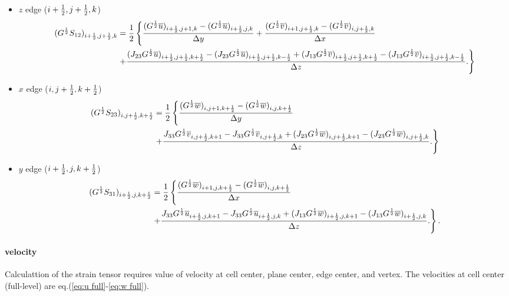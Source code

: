 \begin{itemize}
  \item $z$ edge ($i+\frac{1}{2},j+\frac{1}{2},k$)
    \begin{align}
      (G^{\frac{1}{2}}S_{12})_{i+\frac{1}{2},j+\frac{1}{2},k} &= \frac{1}{2}\left\{
      \frac{(G^{\frac{1}{2}}\overline{u})_{i+\frac{1}{2},j+1,k}-(G^{\frac{1}{2}}\overline{u})_{i+\frac{1}{2},j,k}}{\Delta y}
     +\frac{(G^{\frac{1}{2}}\overline{v})_{i+1,j+\frac{1}{2},k}-(G^{\frac{1}{2}}\overline{v})_{i,j+\frac{1}{2},k}}{\Delta x}  \right.\nonumber \\ &\left.
     +\frac{(J_{23}G^{\frac{1}{2}}\overline{u})_{i+\frac{1}{2},j+\frac{1}{2},k+\frac{1}{2}}-(J_{23}G^{\frac{1}{2}}\overline{u})_{i+\frac{1}{2},j+\frac{1}{2},k-\frac{1}{2}} + (J_{13}G^{\frac{1}{2}}\overline{v})_{i+\frac{1}{2},j+\frac{1}{2},k+\frac{1}{2}}-(J_{13}G^{\frac{1}{2}}\overline{v})_{i+\frac{1}{2},j+\frac{1}{2},k-\frac{1}{2}}}{\Delta z}.
      \right\}
    \end{align}

  \item $x$ edge ($i,j+\frac{1}{2},k+\frac{1}{2}$)
    \begin{align}
      (G^{\frac{1}{2}}S_{23})_{i,j+\frac{1}{2},k+\frac{1}{2}} &= \frac{1}{2}\left\{
      \frac{(G^{\frac{1}{2}}\overline{w})_{i,j+1,k+\frac{1}{2}}-(G^{\frac{1}{2}}\overline{w})_{i,j,k+\frac{1}{2}}}{\Delta y} \right. \nonumber \\ & \left.
      + \frac{J_{33}G^{\frac{1}{2}}\overline{v}_{i,j+\frac{1}{2},k+1}-J_{33}G^{\frac{1}{2}}\overline{v}_{i,j+\frac{1}{2},k} + (J_{23}G^{\frac{1}{2}}\overline{w})_{i,j+\frac{1}{2},k+1}-(J_{23}G^{\frac{1}{2}}\overline{w})_{i,j+\frac{1}{2},k}}{\Delta z}.
      \right\}
    \end{align}

  \item $y$ edge ($i+\frac{1}{2},j,k+\frac{1}{2}$)
    \begin{align}
      (G^{\frac{1}{2}}S_{31})_{i+\frac{1}{2},j,k+\frac{1}{2}} &= \frac{1}{2}\left\{
      \frac{(G^{\frac{1}{2}}\overline{w})_{i+1,j,k+\frac{1}{2}}-(G^{\frac{1}{2}}\overline{w})_{i,j,k+\frac{1}{2}}}{\Delta x} \right. \nonumber \\ & \left.
     +\frac{J_{33}G^{\frac{1}{2}}\overline{u}_{i+\frac{1}{2},j,k+1}-J_{33}G^{\frac{1}{2}}\overline{u}_{i+\frac{1}{2},j,k} + (J_{13}G^{\frac{1}{2}}\overline{w})_{i+\frac{1}{2},j,k+1}-(J_{13}G^{\frac{1}{2}}\overline{w})_{i+\frac{1}{2},j,k}}{\Delta z}.
      \right\}.
    \end{align}

\end{itemize}


\paragraph{velocity}
Calculattion of the strain tensor
requires value of velocity
at cell center, plane center, edge center, and vertex.
The velocities at cell center (full-level) are eq.(\ref{eq:u full}-\ref{eq:w full}).

